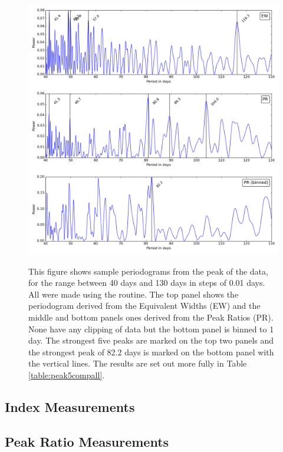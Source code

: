 \begin{figure}[!htbp]
\begin{center}
\includegraphics[scale=0.18]{Figures/summpgrams.png} \\
\end{center}   
\caption{This figure shows sample periodograms from the {\ha} peak of the {\harps} data, for the range between 40 days
  and 130 days in steps of 0.01 days. All were made using the {\gatspy} routine.  The top panel shows the periodogram
  derived from the Equivalent Widths (EW) and the middle and bottom panels ones derived from the Peak Ratios (PR). None
  have any clipping of data but the bottom panel is binned to 1 day.  The strongest five peaks are marked on the top two
  panels and the strongest peak of 82.2 days is marked on the bottom panel with the vertical lines.  The results are set
  out more fully in Table \ref{table:peak5compall}.}
\protect\label{fig:harpspgrams1}
\end{figure}

\subsection{{\ha} Index Measurements}
\protect\label{section:haiper}

\subsection{Peak Ratio Measurements}
\protect\label{section:priper}

